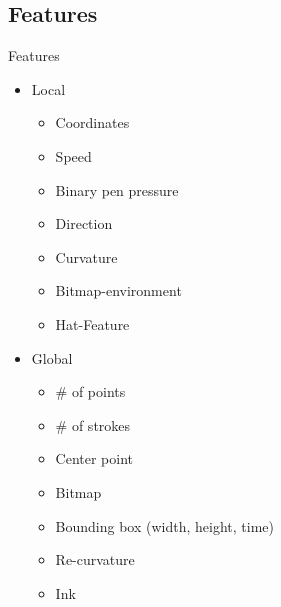 \subsection{Features}
\begin{frame}{Features}
    \begin{itemize}
        \item Local
        \begin{itemize}
            \item Coordinates
            \item Speed
            \item Binary pen pressure
            \item Direction
            \item Curvature
            \item Bitmap-environment
            \item Hat-Feature
        \end{itemize}
        \item Global
        \begin{itemize}
            \item \# of points
            \item \# of strokes
            \item Center point
            \item Bitmap
            \item Bounding box (width, height, time)
            \item Re-curvature
            \item Ink
        \end{itemize}
    \end{itemize}
\end{frame}